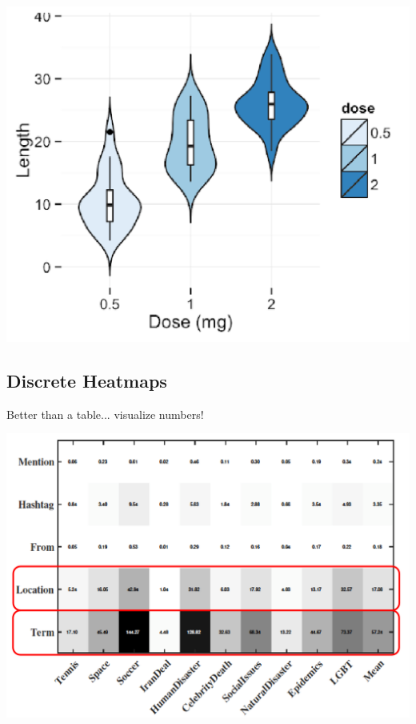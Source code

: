 \documentclass[11pt]{article}
\theoremstyle{definition}
\begin{document}
\includegraphics[width=\textwidth/2]{23.png}
\subsection{Discrete Heatmaps}
Better than a table... visualize numbers!

\includegraphics[width=\textwidth]{24.png}
\end{document}
